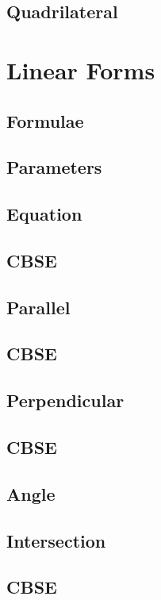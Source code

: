 \documentclass[journal]{IEEEtran}
\begin{document}
\subsection{Quadrilateral}

\newpage
\section{Linear Forms}
\subsection{Formulae}

\subsection{Parameters}

\subsection{Equation }

\subsection{CBSE}

\subsection{Parallel}

\subsection{CBSE}

\subsection{Perpendicular}

\subsection{CBSE}

\subsection{Angle}

\subsection{Intersection}

\subsection{CBSE}

\end{document}
